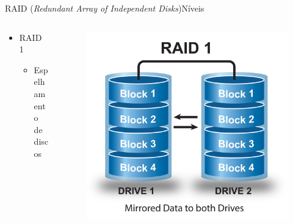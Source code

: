 \documentclass[aspectratio=169,
				xcolor=table]{beamer}
\begin{document}
	\begin{frame}[t]{RAID (\textit{Redundant Array of Independent Disks})}{Níveis}	
		\begin{columns}[t]
			\begin{column}{0.5\textwidth}
				\begin{itemize}
					\item RAID 1
					\begin{itemize}
						\item Espelhamento de discos
					\end{itemize}
				\end{itemize}
				
			\end{column}
			\begin{column}{0.5\textwidth}				
				\begin{figure}
					\centering
				\vspace{-1em}	
					\includegraphics[height=0.7\textheight, keepaspectratio]{../figs/cap08/raid1}
				\end{figure}				
			\end{column}
		\end{columns}	
	\end{frame}	
	
\end{document}
